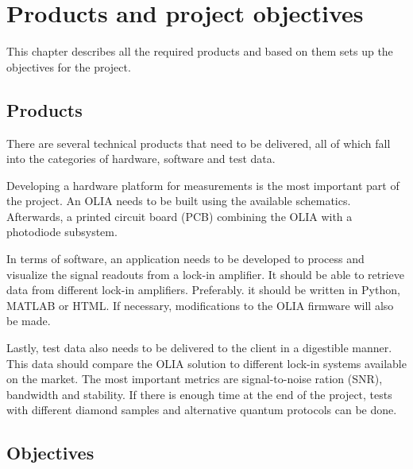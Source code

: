 \documentclass{report}
\begin{document}
	
	
	\chapter{Products and project objectives}
	This chapter describes all the required products and based on them sets up the objectives for the project.
	
	\section{Products}
	There are several technical products that need to be delivered, all of which fall into the categories of hardware, software and test data.
	
	Developing a hardware platform for measurements is the most important part of the project. An OLIA needs to be built using the available schematics. Afterwards, a printed circuit board (PCB) combining the OLIA with a photodiode subsystem.
	
	In terms of software, an application needs to be developed to process and visualize the signal readouts from a lock-in amplifier. It should be able to retrieve data from different lock-in amplifiers. Preferably. it should be written in Python, MATLAB or HTML. If necessary, modifications to the OLIA firmware will also be made. 
	
	Lastly, test data also needs to be delivered to the client in a digestible manner. This data should compare the OLIA solution to different lock-in systems available on the market. The most important metrics are signal-to-noise ration (SNR), bandwidth and stability. If there is enough time at the end of the project, tests with different diamond samples and alternative quantum protocols can be done.
	
	\section{Objectives}
	
	
\end{document}
